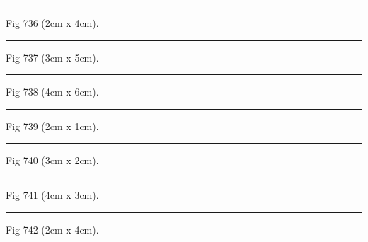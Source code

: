 \documentclass[a4paper,11pt]{article}
\begin{document}
\begin{swarmwrap}%
  \begin{minipage}[t]{2cm}
    \centering
    \rule{\linewidth}{4cm}
    {\footnotesize Fig 736 (2cm x 4cm).}
  \end{minipage}%
\end{swarmwrap}%
\swarmwrapnext
\lipsum[136]%

\begin{swarmwrap}%
  \begin{minipage}[t]{3cm}
    \centering
    \rule{\linewidth}{5cm}
    {\footnotesize Fig 737 (3cm x 5cm).}
  \end{minipage}%
\end{swarmwrap}%
\swarmwrapnext
\lipsum[137]%

\begin{swarmwrap}%
  \begin{minipage}[t]{4cm}
    \centering
    \rule{\linewidth}{6cm}
    {\footnotesize Fig 738 (4cm x 6cm).}
  \end{minipage}%
\end{swarmwrap}%
\swarmwrapnext
\lipsum[138]%

\begin{swarmwrap}%
  \begin{minipage}[t]{2cm}
    \centering
    \rule{\linewidth}{1cm}
    {\footnotesize Fig 739 (2cm x 1cm).}
  \end{minipage}%
\end{swarmwrap}%
\swarmwrapnext
\lipsum[139]%

\begin{swarmwrap}%
  \begin{minipage}[t]{3cm}
    \centering
    \rule{\linewidth}{2cm}
    {\footnotesize Fig 740 (3cm x 2cm).}
  \end{minipage}%
\end{swarmwrap}%
\swarmwrapnext
\lipsum[140]%

\begin{swarmwrap}%
  \begin{minipage}[t]{4cm}
    \centering
    \rule{\linewidth}{3cm}
    {\footnotesize Fig 741 (4cm x 3cm).}
  \end{minipage}%
\end{swarmwrap}%
\swarmwrapnext
\lipsum[141]%

\begin{swarmwrap}%
  \begin{minipage}[t]{2cm}
    \centering
    \rule{\linewidth}{4cm}
    {\footnotesize Fig 742 (2cm x 4cm).}
  \end{minipage}%
\end{swarmwrap}%
\swarmwrapnext
\lipsum[142]%
\end{document}
